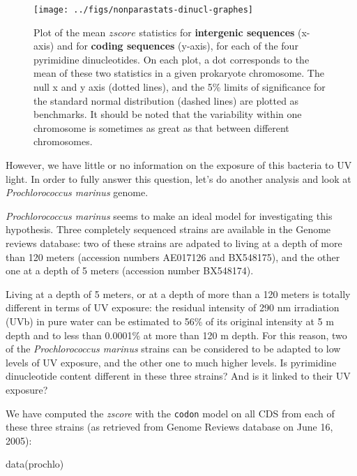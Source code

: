\documentclass{article}
\begin{document}
\begin{figure}[H]
   \begin{center}
\texttt{[image: ../figs/nonparastats-dinucl-graphes]}
\end{center}
   \caption{Plot of the mean $zscore$ statistics for
   \textbf{intergenic sequences} (x-axis) and for \textbf{coding
   sequences} (y-axis), for each of the four pyrimidine dinucleotides.
   On each plot, a dot corresponds to the mean of these two statistics
   in a given prokaryote chromosome. The null x and y axis (dotted
   lines), and the 5\% limits of significance for the standard normal
   distribution (dashed lines) are plotted as benchmarks. It should be
   noted that the variability within one chromosome is sometimes as
   great as that between different chromosomes.}
\label{dinucl-graphes}
\end{figure}

However, we have little or no information on the exposure of this
bacteria to UV light. In order to fully answer this question, let's do
another analysis and look at \textit{Prochlorococcus marinus} genome.

\textit{Prochlorococcus marinus} seems to make an ideal model for
investigating this hypothesis. Three completely sequenced strains are
available in the Genome reviews database: two of these strains are
adpated to living at a depth of more than 120 meters (accession
numbers AE017126 and BX548175), and the other one at a depth of 5
meters (accession number BX548174).

Living at a depth of 5 meters, or at a depth of more than a 120 meters
is totally different in terms of UV exposure: the residual intensity
of 290 nm irradiation (UVb) in pure water can be estimated to 56\% of
its original intensity at 5 m depth and to less than 0.0001\% at more
than 120 m depth. For this reason, two of the \textit{Prochlorococcus
marinus} strains can be considered to be adapted to low levels of UV
exposure, and the other one to much higher levels. Is pyrimidine
dinucleotide content different in these three strains? And is it
linked to their UV exposure?

We have computed the \textit{zscore} with the \texttt{codon} model on
all CDS from each of these three strains (as retrieved from Genome
Reviews database on June 16, 2005):

\begin{Schunk}
\begin{Sinput}
 data(prochlo)
\end{Sinput}
\end{Schunk}
\end{document}
